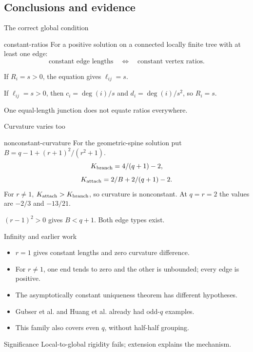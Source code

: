 \documentclass{beamer}
\begin{document}
\subsection{Conclusions and evidence}
\begin{frame}{The correct global condition}
\begin{bookresult}{constant-ratios}
For a positive solution on a connected locally finite tree with at least one edge:
\[
\text{constant edge lengths}\quad\Longleftrightarrow\quad
\text{constant vertex ratios}.
\]
\end{bookresult}
If $R_i=s>0$, the equation gives $\ell_{ij}=s$.

If $\ell_{ij}=s>0$, then $c_i=\deg(i)/s$ and $d_i=\deg(i)/s^2$, so $R_i=s$.

One equal-length junction does not equate ratios everywhere.
\end{frame}
\begin{frame}{Curvature varies too}
\small
\begin{bookresult}{nonconstant-curvature}
For the geometric-spine solution put $B=q-1+(r+1)^2/(r^2+1)$.
\[
K_{\rm branch}=4/(q+1)-2,
\]
\[
K_{\rm attach}=2/B+2/(q+1)-2.
\]
For $r\ne1$, $K_{\rm attach}>K_{\rm branch}$, so curvature is nonconstant. At $q=r=2$ the values are $-2/3$ and $-13/21$.
\end{bookresult}
$(r-1)^2>0$ gives $B<q+1$. Both edge types exist.
\end{frame}
\begin{frame}{Infinity and earlier work}
\begin{itemize}
\item $r=1$ gives constant lengths and zero curvature difference.
\item For $r\ne1$, one end tends to zero and the other is unbounded; every edge is positive.
\item The asymptotically constant uniqueness theorem has different hypotheses.
\item Gubser et al. and Huang et al. already had odd-$q$ examples.
\item This family also covers even $q$, without half-half grouping.
\end{itemize}
\begin{block}{Significance}
Local-to-global rigidity fails; extension explains the mechanism.
\end{block}
\end{frame}
\end{document}
